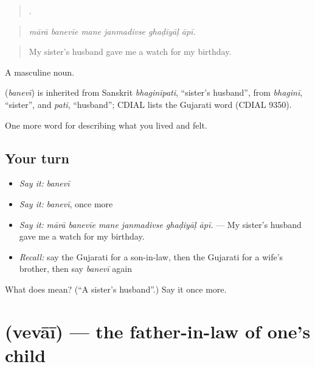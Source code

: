 \begin{quote}
     .
\end{quote}

\begin{quote}
\emph{mārā banevīe mane janmadivse ghaḍiyāḷ āpī.}
\end{quote}

\begin{quote}
My sister's husband gave me a watch for my birthday.
\end{quote}

A masculine noun.

\begin{cousinweb}
\textbf{} (\emph{banevī}) is inherited from Sanskrit \emph{bhaginīpati}, \textquotedblleft{}sister's husband\textquotedblright{}, from \emph{bhaginī}, \textquotedblleft{}sister\textquotedblright{}, and \emph{pati}, \textquotedblleft{}husband\textquotedblright{}; CDIAL lists the Gujarati word (CDIAL 9350).
\end{cousinweb}

\begin{grammarlens}[title={What you've built}]
One more word for describing what you lived and felt.
\end{grammarlens}

\subsection*{Your turn}
\begin{itemize}
\raggedright
  \item \emph{Say it:} \emph{banevī}
  \item \emph{Say it:} \emph{banevī}, once more
  \item \emph{Say it:} \emph{mārā banevīe mane janmadivse ghaḍiyāḷ āpī.} — My sister's husband gave me a watch for my birthday.
  \item \emph{Recall:} say the Gujarati for a son-in-law, then the Gujarati for a wife's brother, then say \emph{banevī} again
\end{itemize}

\begin{tcolorbox}[breakable,colback=teal!4,colframe=teal!35!black,title={Before you move on}]
What does  mean? (\textquotedblleft{}A sister's husband\textquotedblright{}.) Say it once more.
\end{tcolorbox}
\section[\texorpdfstring{\gu{વેવાઈ} (vevāī)}{વેવાઈ (vevāī)}]{ (vevāī) — the father-in-law of one's child}

